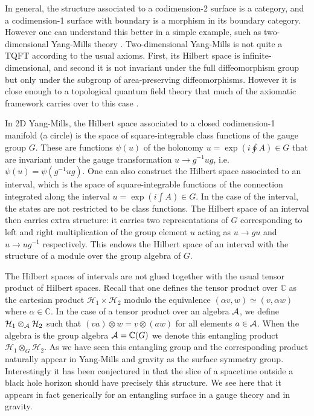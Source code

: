 \documentclass[a4paper,11pt]{article}
\begin{document}
In general, the structure associated to a codimension-2 surface is a category, and a codimension-1 surface with boundary is a morphism in its boundary category.
However one can understand this better in a simple example, such as two-dimensional Yang-Mills theory \cite{Oeckl2006}.
Two-dimensional Yang-Mills is not quite a TQFT according to the usual axioms. First, its Hilbert space is infinite-dimensional, and second it is not invariant under the full diffeomorphism group but only under the subgroup of area-preserving diffeomorphisms.
However it is close enough to a topological quantum field theory that much of the axiomatic framework carries over to this case \cite{Cordes1994}.

In 2D Yang-Mills, the Hilbert space associated to a closed codimension-1 manifold (a circle) is the space of square-integrable class functions of the gauge group $G$.
These are functions $\psi(u)$ of the holonomy $u = \exp(i \oint A) \in G$ that are invariant under the gauge transformation $u \to g^{-1} u g$, i.e. $\psi(u) = \psi(g^{-1} u g)$.
One can also construct the Hilbert space associated to an interval, which is the space of square-integrable functions of the connection integrated along the interval $u = \exp(i \int A) \in G$.
In the case of the interval, the states are not restricted to be class functions.
The Hilbert space of an interval then carries extra structure: it carries two representations of $G$ corresponding to left and right multiplication of the group element $u$ acting as $u \to g u$ and $u \to u g^{-1}$ respectively.
This endows the Hilbert space of an interval with the structure of a module over the group algebra of $G$.

The Hilbert spaces of intervals are not glued together with the usual tensor product of Hilbert spaces. 
Recall that one defines the tensor product over $\mathbb{C}$ as the cartesian product $\mathcal{H}_1 \times \mathcal{H}_2$ modulo the equivalence $(\alpha v, w )\simeq( v,\alpha w)$ where $\alpha\in \mathbb{C}$.
In the case of a tensor product over an algebra ${\cal A}$, we define $\mathcal{H}_1 \otimes_{\cal A} \mathcal{H}_2$ such that $(v a) \otimes w = v \otimes (a w)$ for all elements $a \in {\cal A}$. When the algebra is the group algebra ${\cal A}=\mathbb{C}(G)$ we denote this entangling product 
$\mathcal{H}_1 \otimes_{G} \mathcal{H}_2$. 
As we have seen this entangling group and the corresponding product naturally appear in Yang-Mills and gravity as the surface symmetry group. 
Interestingly it has been conjectured in \cite{Witten2009} that the slice of a spacetime outside a black hole horizon should have precisely this structure. 
We see here that it appears in fact generically for an entangling surface in a gauge theory and in gravity.
\end{document}
